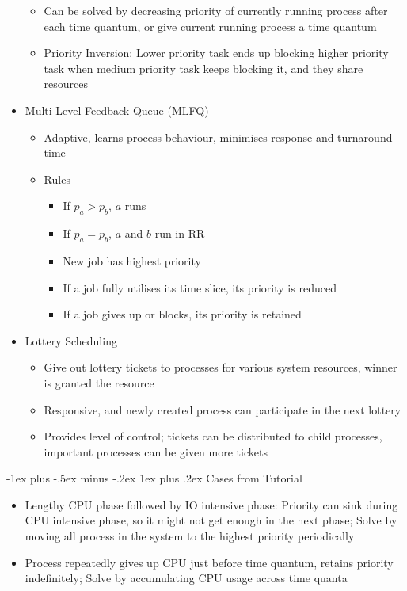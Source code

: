 \documentclass[10pt, landscape]{article}
\makeatletter
\renewcommand{\subsection}{\@startsection{subsection}{3}{0mm}%
                                {-1ex plus -.5ex minus -.2ex}%
                                {1ex plus .2ex}%
                                {\normalfont\small\bfseries}}%
\makeatother
\begin{document}
\begin{multicols*}{3}
\begin{itemize}
\begin{itemize}
        \item Can be solved by decreasing priority of currently running process after each time quantum, or give current running process a time quantum
        \item Priority Inversion: Lower priority task ends up blocking higher priority task when medium priority task keeps blocking it, and they share resources
    \end{itemize}
    \item Multi Level Feedback Queue (MLFQ)
    \begin{itemize}
        \item Adaptive, learns process behaviour, minimises response and turnaround time
        \item Rules
        \begin{itemize}
            \item If $p_a>p_b$, $a$ runs
            \item If $p_a=p_b$, $a$ and $b$ run in RR
            \item New job has highest priority
            \item If a job fully utilises its time slice, its priority is reduced
            \item If a job gives up or blocks, its priority is retained
        \end{itemize}
    \end{itemize}
    \item Lottery Scheduling
    \begin{itemize}
        \item Give out lottery tickets to processes for various system resources, winner is granted the resource
        \item Responsive, and newly created process can participate in the next lottery
        \item Provides level of control; tickets can be distributed to child processes, important processes can be given more tickets
    \end{itemize}
\end{itemize}

\subsection{Cases from Tutorial}
\begin{itemize}
    \item Lengthy CPU phase followed by IO intensive phase: Priority can sink during CPU intensive phase, so it might not get enough in the next phase; Solve by moving all process in the system to the highest priority periodically
    \item Process repeatedly gives up CPU just before time quantum, retains priority indefinitely; Solve by accumulating CPU usage across time quanta
\end{itemize}


\end{multicols*}
\end{document}
